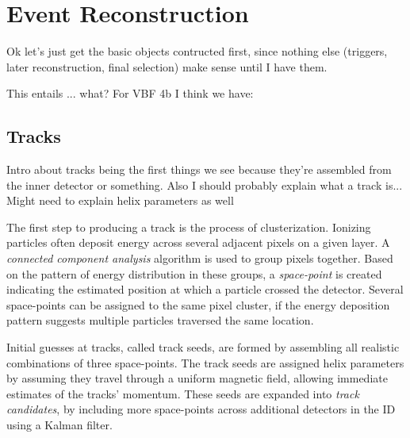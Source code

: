 \chapter{Event Reconstruction}

    
%


    Ok let's just get the basic objects contructed first, since nothing else (triggers, later reconstruction, final selection)
        make sense until I have them.

    This entails ... what? For VBF 4b I think we have:


    \section{Tracks}
        Intro about tracks being the first things we see because they're assembled from the inner detector or something.
        Also I should probably explain what a track is...
        Might need to explain helix parameters as well

        The first step to producing a track is the process of clusterization.
        Ionizing particles often deposit energy across several adjacent pixels on a given layer.
        A \textit{connected component analysis} algorithm is used to group pixels together. 
        Based on the pattern of energy distribution in these groups,
            a \textit{space-point} is created indicating the estimated position at which a particle crossed the detector.
        Several space-points can be assigned to the same pixel cluster,
            if the energy deposition pattern suggests multiple particles traversed the same location.

        Initial guesses at tracks, called track seeds, are formed by assembling all realistic combinations of three space-points.
        The track seeds are assigned helix parameters by assuming they travel through a uniform magnetic field,
            allowing immediate estimates of the tracks' momentum.
        These seeds are expanded into \textit{track candidates},
            by including more space-points across additional detectors in the ID using a Kalman filter.

